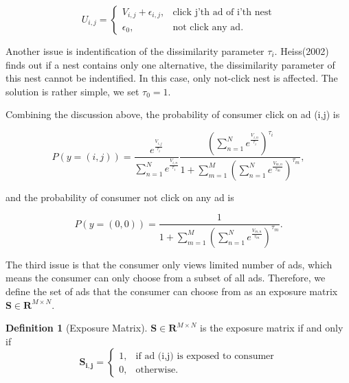 \documentclass[12pt]{article}
\theoremstyle{definition}
\newtheorem{definition}{Definition}[section]
\newcommand{\matr}[1]{\mathbf{#1}} %
\begin{document}
\begin{sloppypar}
\begin{equation}\label{eq: utility2}
    U_{i,j} = 
    \begin{cases}
        V_{i,j} + \epsilon_{i,j}, &\text{click j'th ad of i'th nest} \\
        \epsilon_0, &\text{not click any ad}.     
    \end{cases}
\end{equation}

Another issue is indentification of the dissimilarity parameter $\tau_i$. Heiss(2002) finds out if a nest contains only one alternative, the dissimilarity parameter of this nest cannot be indentified. In this case, only not-click nest is affected. The solution is rather simple, we set $\tau_0=1$.

\indent Combining the discussion above, the probability of consumer click on ad (i,j) is

\begin{equation}
    P(y=(i,j)) 
        = \frac{e^\frac{{V_{i,j}}}{\tau_i}}{\sum_{n=1}^{N} e^\frac{{V_{i,n}}}{\tau_i}} \frac{(\sum_{n=1}^{N} e^\frac{{V_{i,n}}}{\tau_i})^{\tau_i}}{1+\sum_{m=1}^{M}(\sum_{n=1}^{N} e^\frac{{V_{m,n}}}{\tau_m})^{\tau_m}},
\end{equation}

and the probability of consumer not click on any ad is

\begin{equation}
    P(y=(0,0)) 
        = \frac{1}{1+\sum_{m=1}^{M}(\sum_{n=1}^{N} e^\frac{{V_{m,n}}}{\tau_m})^{\tau_m}}.
\end{equation}

The third issue is that the consumer only views limited number of ads, which means the consumer can only choose from a subset of all ads. Therefore, we define the set of ads that the consumer can choose from as an exposure matrix $\matr{S} \in \mathbf{R}^{M \times N}$.

\begin{definition}[Exposure Matrix]\label{exposure matrix}
    $\matr{S} \in \mathbf{R}^{M \times N}$ is the exposure matrix if and only if
    \begin{equation*}
        \matr{S_{i,j}} = 
            \begin{cases}
            1, & \text{if ad (i,j) is exposed to consumer} \\
            0, & \text{otherwise}.
            \end{cases}
    \end{equation*}
\end{definition}


\end{sloppypar}
\end{document}
